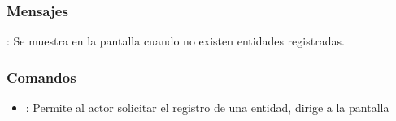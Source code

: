 \subsubsection{Mensajes}

\begin{Citemize}
	\item {}: Se muestra en la pantalla  cuando no existen entidades registradas.
\end{Citemize}

\label{IU12A}
\subsubsection{Comandos}
\begin{itemize}
	\item {}: Permite al actor solicitar el registro de una entidad, dirige a la pantalla 
\end{itemize}